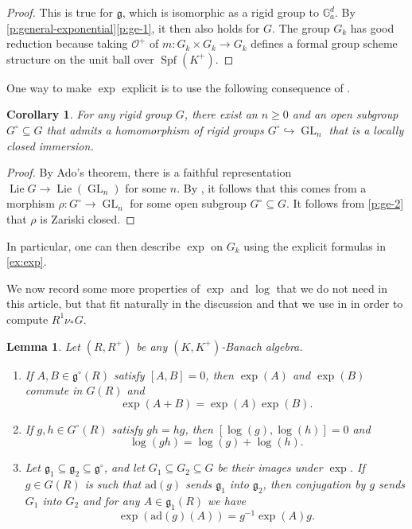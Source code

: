 \documentclass[10pt,a4paper]{article}
\newtheorem{Lemma}[thm]{Lemma}
\newtheorem{Corollary}[thm]{Corollary}
\theoremstyle{definition}
\theoremstyle{remark}
\newcommand{\G}{\mathbb{G}}
\renewcommand{\O}{\mathcal{O}}
\newcommand{\mg}{\mathfrak{g}}
\newcommand{\GL}{\operatorname{GL}}
\newcommand{\ad}{\mathrm{ad}}
\newcommand{\Spf}{\operatorname{Spf}}
\numberwithin{equation}{section}
\begin{document}
\begin{proof}
	This is true for $\mathfrak g$, which is isomorphic as a rigid group to $\G_a^d$. By \cref{p:general-exponential}\eqref{p:ge-1}, it then also holds for $G$. The group $G_k$ has good reduction because taking $\O^+$ of $m\colon G_k\times G_k\to G_k$ defines a formal group scheme structure on the unit ball over $\Spf(K^+)$.
\end{proof}

One way to make $\exp$ explicit is to use the following consequence of  . 

\begin{Corollary}
	For any rigid group $G$, there exist an $n\geq 0$ and an open subgroup $G^\circ\subseteq G$ that admits a homomorphism of rigid groups $G^\circ\hookrightarrow \GL_n$ that is a locally closed immersion.
\end{Corollary}

\begin{proof}
	By Ado's theorem, there is a faithful representation $\operatorname{Lie} G\to \operatorname{Lie}(\GL_n)$ for some $n$. By , it follows that this comes from a morphism $\rho\colon G^\circ\to \GL_n$ for some open subgroup $G^\circ\subseteq G$. It follows from \eqref{p:ge-2} that $\rho$ is Zariski closed.
\end{proof}

In particular, one can then describe $\exp$ on $G_k$ using the explicit formulas in \cref{ex:exp}.

We now record some more properties of $\exp$ and $\log$ that we do not need in this article, but that fit naturally in the discussion and that we  use in \cite{heuer-sheafified-paCS} in order to compute $R^1\nu_{\ast}G$.

\begin{Lemma}\label{l:exp-on-matrix}
	Let $(R,R^+)$ be any $(K,K^+)$-Banach algebra.
	\begin{enumerate}
		\item\label{l:eom-1}
		If $A,B\in \mathfrak g^\circ(R)$ satisfy $[A,B]=0$, then $\exp(A)$ and $\exp(B)$ commute in $G(R)$ and 
		\[\exp(A+B)=\exp(A)\exp(B).\]
		\item\label{l:eom-2} If $g,h\in G^\circ(R)$ satisfy $gh=hg$, then $[\log(g),\log(h)]=0$ and 
		\[\log(gh)=\log(g)+\log(h).\]
		\item\label{l:eom-3} Let $\mathfrak g_1\subseteq\mathfrak g_2\subseteq \mg^\circ$, and let $G_1\subseteq G_2\subseteq G$ be their images under $\exp$. If $g\in G(R)$ is such that $\ad(g)$ sends $\mathfrak g_{1}$ into $\mathfrak g_{2}$, then conjugation by $g$ sends $G_{1}$ into $G_{2}$ and for any $A\in \mg_{1}(R)$ we have
		\[ \exp(\ad(g)(A))=g^{-1}\exp(A)g.\]
	\end{enumerate}
\end{Lemma}
\end{document}
